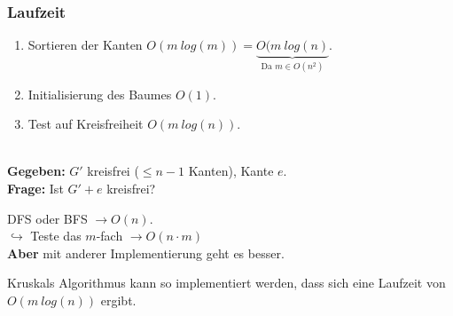 \subsubsection*{Laufzeit}
\begin{enumerate}
	\item Sortieren der Kanten $O(m~log(m)) = \underbrace{O(m~log(n)}_{\text{Da } m \in O(n^2)}$.
	\item Initialisierung des Baumes $O(1)$.
	\item Test auf Kreisfreiheit $O(m~log(n))$.
\end{enumerate}
\begin{problem}~\\[5pt]
	\hspace*{10pt}\textbf{Gegeben: } $G'$ kreisfrei ($\le n-1$ Kanten), Kante $e$.\\[5pt]
	\hspace*{10pt}\textbf{Frage: } Ist $G' + e$ kreisfrei?
\end{problem}
DFS oder BFS $\to O(n)$.\\
$\hookrightarrow$ Teste das $m$-fach $\to O(n\cdot m)$\\
\textbf{Aber} mit anderer Implementierung geht es besser.
\begin{satz}
	Kruskals Algorithmus kann so implementiert werden, dass sich eine Laufzeit von $O(m~log(n))$ ergibt.
\end{satz}
